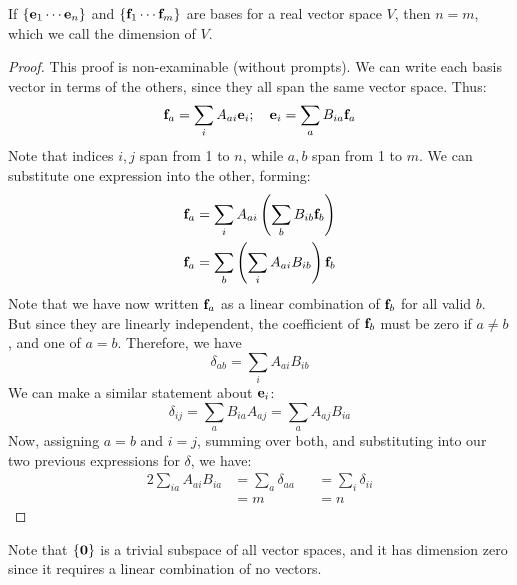\begin{theorem}
	If \(\{\vb e_1 \cdots \vb e_n \}\) and \(\{ \vb f_1 \cdots \vb f_m \}\) are bases for a real vector space \(V\), then \(n=m\), which we call the dimension of \(V\).
\end{theorem}
\begin{proof}
	This proof is non-examinable (without prompts).
	We can write each basis vector in terms of the others, since they all span the same vector space.
	Thus:
	\[
		\vb f_a = \sum_i A_{ai} \vb e_i;\quad \vb e_i = \sum_a B_{ia} \vb f_a
	\]
	Note that indices \(i,j\) span from 1 to \(n\), while \(a,b\) span from 1 to \(m\).
	We can substitute one expression into the other, forming:
	\begin{align*}
		\vb f_a & = \sum_i A_{ai} \left( \sum_b B_{ib}\vb f_b \right)  \\
		\vb f_a & = \sum_b \left( \sum_i A_{ai} B_{ib} \right) \vb f_b
	\end{align*}
	Note that we have now written \(\vb f_a\) as a linear combination of \(\vb f_b\) for all valid \(b\).
	But since they are linearly independent, the coefficient of \(\vb f_b\) must be zero if \(a \neq b\), and one of \(a = b\).
	Therefore, we have
	\[
		\delta_{ab} = \sum_i A_{ai} B_{ib}
	\]
	We can make a similar statement about \(\vb e_i\):
	\[
		\delta_{ij} = \sum_a B_{ia} A_{aj} = \sum_a A_{aj} B_{ia}
	\]
	Now, assigning \(a=b\) and \(i=j\), summing over both, and substituting into our two previous expressions for \(\delta\), we have:
	\begin{alignat*}{2}
		\sum_{ia} A_{ai} B_{ia} & = \sum_a \delta_{aa} &  & = \sum_i \delta_{ii} \\
		                        & = m                  &  & = n
	\end{alignat*}
\end{proof}

Note that \(\{ \vb 0 \}\) is a trivial subspace of all vector spaces, and it has dimension zero since it requires a linear combination of no vectors.

